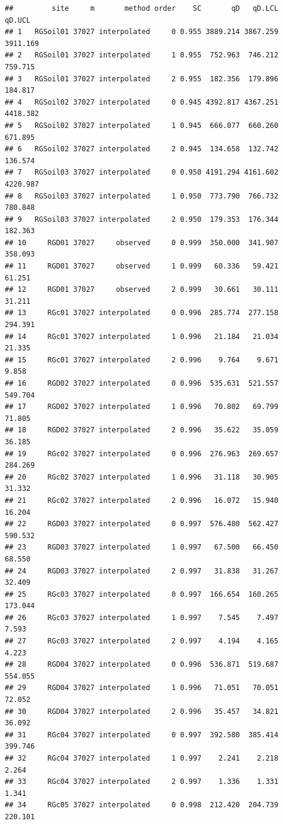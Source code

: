 \documentclass[]{article}
\begin{document}
\begin{verbatim}
##         site     m       method order    SC       qD   qD.LCL   qD.UCL
## 1   RGSoil01 37027 interpolated     0 0.955 3889.214 3867.259 3911.169
## 2   RGSoil01 37027 interpolated     1 0.955  752.963  746.212  759.715
## 3   RGSoil01 37027 interpolated     2 0.955  182.356  179.896  184.817
## 4   RGSoil02 37027 interpolated     0 0.945 4392.817 4367.251 4418.382
## 5   RGSoil02 37027 interpolated     1 0.945  666.077  660.260  671.895
## 6   RGSoil02 37027 interpolated     2 0.945  134.658  132.742  136.574
## 7   RGSoil03 37027 interpolated     0 0.950 4191.294 4161.602 4220.987
## 8   RGSoil03 37027 interpolated     1 0.950  773.790  766.732  780.848
## 9   RGSoil03 37027 interpolated     2 0.950  179.353  176.344  182.363
## 10     RGD01 37027     observed     0 0.999  350.000  341.907  358.093
## 11     RGD01 37027     observed     1 0.999   60.336   59.421   61.251
## 12     RGD01 37027     observed     2 0.999   30.661   30.111   31.211
## 13     RGc01 37027 interpolated     0 0.996  285.774  277.158  294.391
## 14     RGc01 37027 interpolated     1 0.996   21.184   21.034   21.335
## 15     RGc01 37027 interpolated     2 0.996    9.764    9.671    9.858
## 16     RGD02 37027 interpolated     0 0.996  535.631  521.557  549.704
## 17     RGD02 37027 interpolated     1 0.996   70.802   69.799   71.805
## 18     RGD02 37027 interpolated     2 0.996   35.622   35.059   36.185
## 19     RGc02 37027 interpolated     0 0.996  276.963  269.657  284.269
## 20     RGc02 37027 interpolated     1 0.996   31.118   30.905   31.332
## 21     RGc02 37027 interpolated     2 0.996   16.072   15.940   16.204
## 22     RGD03 37027 interpolated     0 0.997  576.480  562.427  590.532
## 23     RGD03 37027 interpolated     1 0.997   67.500   66.450   68.550
## 24     RGD03 37027 interpolated     2 0.997   31.838   31.267   32.409
## 25     RGc03 37027 interpolated     0 0.997  166.654  160.265  173.044
## 26     RGc03 37027 interpolated     1 0.997    7.545    7.497    7.593
## 27     RGc03 37027 interpolated     2 0.997    4.194    4.165    4.223
## 28     RGD04 37027 interpolated     0 0.996  536.871  519.687  554.055
## 29     RGD04 37027 interpolated     1 0.996   71.051   70.051   72.052
## 30     RGD04 37027 interpolated     2 0.996   35.457   34.821   36.092
## 31     RGc04 37027 interpolated     0 0.997  392.580  385.414  399.746
## 32     RGc04 37027 interpolated     1 0.997    2.241    2.218    2.264
## 33     RGc04 37027 interpolated     2 0.997    1.336    1.331    1.341
## 34     RGc05 37027 interpolated     0 0.998  212.420  204.739  220.101

\end{verbatim}
\end{document}
